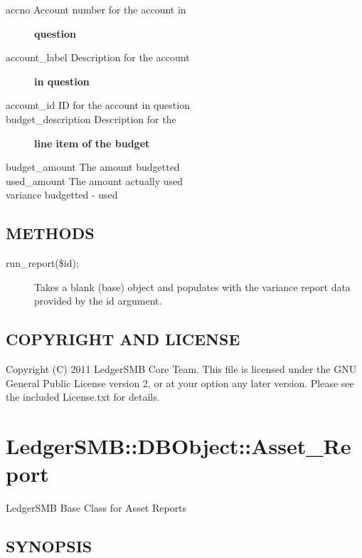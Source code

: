 \begin{description}
\begin{description}
\begin{description}
\begin{description}
\begin{description}
\begin{description}
\begin{description}
\begin{description}
\begin{description}
\begin{description}
\item[{accno Account number for the account in}] \textbf{question}
\item[{account\_label Description for the account}] \textbf{in question}
\item[{account\_id ID for the account in question}] \mbox{}
\item[{budget\_description Description for the}] \textbf{line item of the budget}
\item[{budget\_amount
The amount budgetted}] \mbox{}
\item[{used\_amount
The amount actually used}] \mbox{}
\item[{variance
budgetted - used}] \mbox{}\end{description}
\end{description}
\subsection*{METHODS\label{LedgerSMB::DBObject::Budget_Report_METHODS}}
\begin{description}

\item[{run\_report(\$id);}] \mbox{}

Takes a blank (base) object and populates with the variance report data provided
by the id argument.

\end{description}
\subsection*{COPYRIGHT AND LICENSE\label{LedgerSMB::DBObject::Budget_Report_COPYRIGHT_AND_LICENSE}}


Copyright (C) 2011 LedgerSMB Core Team.  This file is licensed under the GNU 
General Public License version 2, or at your option any later version.  Please
see the included License.txt for details.

\section{LedgerSMB::DBObject::Asset\_Report\label{LedgerSMB::DBObject::Asset_Report}}


LedgerSMB Base Class for Asset Reports

\subsection*{SYNOPSIS\label{LedgerSMB::DBObject::Asset_Report_SYNOPSIS}}



\end{description}
\end{description}
\end{description}
\end{description}
\end{description}
\end{description}
\end{description}
\end{description}
